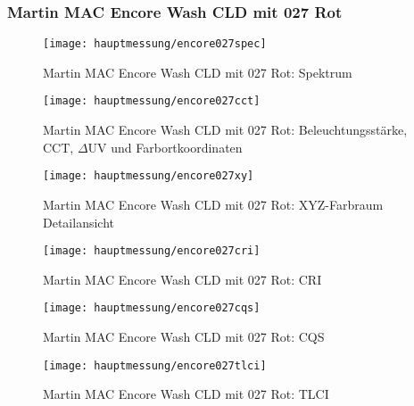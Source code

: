 \documentclass[pagesize,paper=A4,fontsize=12pt,utf8,numbers=noenddot,bibliography=totoc,listof=totoc,DIV=11,BCOR=1mm]{scrreprt}
\begin{document}
\subsubsection{Martin MAC Encore Wash CLD mit 027 Rot}

\begin{figure}[htp]     %
\centering
\texttt{[image: hauptmessung/encore027spec]} 
\caption {Martin MAC Encore Wash CLD mit 027 Rot: Spektrum} 
\end{figure}

\begin{figure}[htp]     %
\centering
\texttt{[image: hauptmessung/encore027cct]} 
\caption {Martin MAC Encore Wash CLD mit 027 Rot: Beleuchtungsstärke, CCT, $\Delta$UV und Farbortkoordinaten} 
\end{figure}

\begin{figure}[htp]     %
\centering
\texttt{[image: hauptmessung/encore027xy]} 
\caption {Martin MAC Encore Wash CLD mit 027 Rot: XYZ-Farbraum Detailansicht} 
\end{figure}

\begin{figure}[htp]     %
\centering
\texttt{[image: hauptmessung/encore027cri]} 
\caption {Martin MAC Encore Wash CLD mit 027 Rot: CRI} 
\end{figure}

\begin{figure}[htp]     %
\centering
\texttt{[image: hauptmessung/encore027cqs]} 
\caption {Martin MAC Encore Wash CLD mit 027 Rot: CQS} 
\end{figure}

\begin{figure}[htp]     %
\centering
\texttt{[image: hauptmessung/encore027tlci]} 
\caption {Martin MAC Encore Wash CLD mit 027 Rot: TLCI} 
\end{figure}
\end{document}

